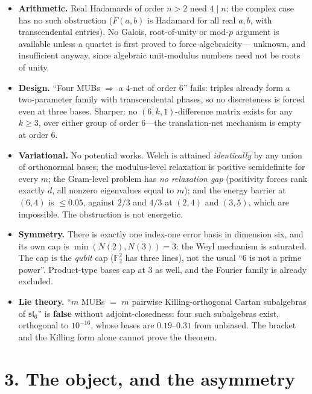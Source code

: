 \documentclass[10pt]{article}
\begin{document}
\begin{itemize}\setlength{\itemsep}{1pt}\setlength{\parskip}{0pt}
\item \textbf{Arithmetic.} Real Hadamards of order $n>2$ need $4\mid n$; the complex case has no such
obstruction ($F(a,b)$ is Hadamard for all real $a,b$, with transcendental entries). No Galois,
root-of-unity or mod-$p$ argument is available unless a quartet is first proved to force algebraicity---
unknown, and insufficient anyway, since algebraic unit-modulus numbers need not be roots of unity.
\item \textbf{Design.} ``Four MUBs $\Rightarrow$ a $4$-net of order $6$'' fails: triples already form a
two-parameter family with transcendental phases, so no discreteness is forced even at three bases.
Sharper: no $(6,k,1)$-difference matrix exists for any $k\ge3$, over either group of order $6$---the
translation-net mechanism is empty at order $6$.
\item \textbf{Variational.} No potential works. Welch is attained \emph{identically} by any union of
orthonormal bases; the modulus-level relaxation is positive semidefinite for every $m$; the Gram-level
problem has \emph{no relaxation gap} (positivity forces rank exactly $d$, all nonzero eigenvalues equal
to $m$); and the energy barrier at $(6,4)$ is $\le0.05$, against $2/3$ and $4/3$ at $(2,4)$ and $(3,5)$,
which are impossible. The obstruction is not energetic.
\item \textbf{Symmetry.} There is exactly one index-one error basis in dimension six, and its own cap is
$\min(N(2),N(3))=3$: the Weyl mechanism is saturated. The cap is the \emph{qubit} cap ($\mathbb{F}_2^2$
has three lines), not the usual ``$6$ is not a prime power''. Product-type bases cap at $3$ as well,
and the Fourier family is already excluded.
\item \textbf{Lie theory.} ``$m$ MUBs $=$ $m$ pairwise Killing-orthogonal Cartan subalgebras of
$\mathfrak{sl}_6$'' is \textbf{false} without adjoint-closedness: four such subalgebras exist, orthogonal
to $10^{-16}$, whose bases are $0.19$--$0.31$ from unbiased. The bracket and the Killing form alone
cannot prove the theorem.
\end{itemize}

\section*{3. The object, and the asymmetry}
\end{document}
